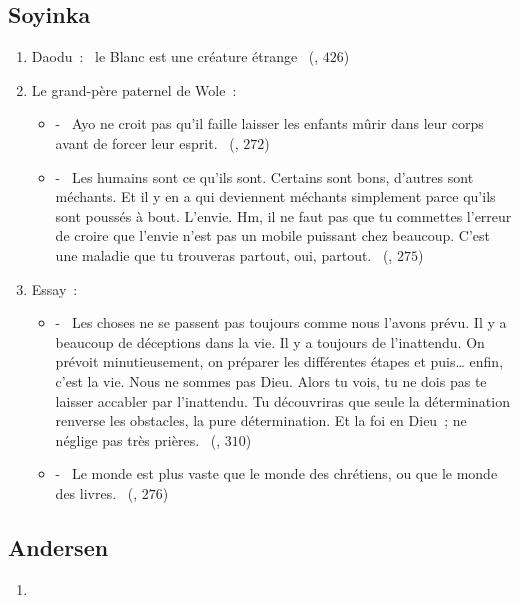 \documentclass[a4paper, 11pt, hidelinks]{article}
\newcommand{\rb}[1]{\Romanbar{#1}}
\begin{document}
\subsection{Soyinka}


\begin{enumerate}
    \item Daodu : \og{} le Blanc est une créature étrange \fg{} (\rb{15}, $426$)
    \item Le grand-père paternel de Wole : 
        \begin{itemize}
            \item - \og{} Ayo ne croit pas qu’il faille laisser les enfants mûrir dans leur corps avant de forcer leur esprit. \fg{} (\rb{9}, $272$)
            \item - \og{} Les humains sont ce qu’ils sont. Certains sont bons, d’autres sont méchants. Et il y en a qui deviennent méchants simplement parce qu’ils sont poussés à bout. L’envie. Hm, il ne faut pas que tu commettes l’erreur de croire que l’envie n’est pas un mobile puissant chez beaucoup. C’est une maladie que tu trouveras partout, oui, partout. \fg{} (\rb{9}, $275$)
        \end{itemize}    
    \item Essay : 
        \begin{itemize}
            \item - \og{} Les choses ne se passent pas toujours comme nous l’avons prévu. Il y a beaucoup de déceptions dans la vie. Il y a toujours de l’inattendu. On prévoit minutieusement, on préparer les différentes étapes et puis… enfin, c’est la vie. Nous ne sommes pas Dieu. Alors tu vois, tu ne dois pas te laisser accabler par l’inattendu. Tu découvriras que seule la détermination renverse les obstacles, la pure détermination. Et la foi en Dieu ; ne néglige pas très prières. \fg{} (\rb{11}, $310$)
            \item - \og{} Le monde est plus vaste que le monde des chrétiens, ou que le monde des livres. \fg{} (\rb{9}, $276$)
        \end{itemize}
\end{enumerate}


\subsection{Andersen}


\begin{enumerate}
    \item 
\end{enumerate}
\end{document}
